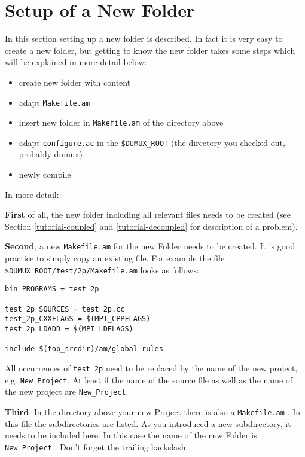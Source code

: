 \section{Setup of a New Folder}

In this section setting up a new folder is described. In fact it is very easy to create a new folder, but getting \Dumux to know the new folder takes some steps which will be explained in more detail below:

\begin{itemize}
 \item create new folder with content
 \item adapt \verb+Makefile.am+
 \item insert new folder in \verb+Makefile.am+ of the directory above
 \item adapt \verb+configure.ac+ in the \verb+$DUMUX_ROOT+ (the directory you checked out, probably dumux)
 \item newly compile \Dumux
\end{itemize}

\noindent In more detail:

\textbf{First} of all, the new folder including all relevant files needs to be created (see Section \ref{tutorial-coupled} and \ref{tutorial-decoupled} for description of a problem). 

\textbf{Second}, a new \verb+Makefile.am+ for the new Folder needs to be created. It is good practice to simply copy an existing file. For example the file \verb+$DUMUX_ROOT/test/2p/Makefile.am+ looks as follows:
\begin{verbatim}
bin_PROGRAMS = test_2p

test_2p_SOURCES = test_2p.cc
test_2p_CXXFLAGS = $(MPI_CPPFLAGS) 
test_2p_LDADD = $(MPI_LDFLAGS) 

include $(top_srcdir)/am/global-rules
\end{verbatim}

All occurrences of \verb+test_2p+ need to be replaced by the name of the new project, e.g. \verb+New_Project+. At least if the name of the source file as well as the name of the new project are \verb+New_Project+.

\textbf{Third}: In the directory above your new Project there is also a \verb+Makefile.am+ . In this file the subdirectories are listed. As you introduced a new subdirectory, it needs to be included here. In this case the name of the new Folder is \verb+New_Project+ . Don't forget the trailing backslash.

